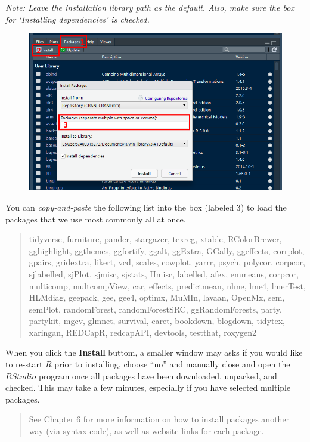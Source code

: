\documentclass[]{book}
\begin{document}
\emph{Note: Leave the installation library path as the default. Also,
make sure the box for `Installing dependencies' is checked.}

\begin{figure}
\centering
\includegraphics{images/Install_Package_Screenshot.png}
\caption{}
\end{figure}

You can \emph{copy-and-paste} the following list into the box (labeled
3) to load the packages that we use most commonly all at once.

\begin{quote}
tidyverse, furniture, pander, stargazer, texreg, xtable, RColorBrewer,
gghighlight, ggthemes, ggfortify, ggalt, ggExtra, GGally, ggeffects,
corrplot, gpairs, gridextra, likert, vcd, scales, cowplot, yarrr, psych,
polycor, corpcor, sjlabelled, sjPlot, sjmisc, sjstats, Hmisc, labelled,
afex, emmeans, corpcor, multicomp, multcompView, car, effects,
predictmean, nlme, lme4, lmerTest, HLMdiag, geepack, gee, gee4, optimx,
MuMIn, lavaan, OpenMx, sem, semPlot, randomForest, randomForestSRC,
ggRandomForests, party, partykit, mgcv, glmnet, survival, caret,
bookdown, blogdown, tidytex, xaringan, REDCapR, redcapAPI, devtools,
testthat, roxygen2
\end{quote}

When you click the \textbf{Install} buttom, a smaller window may asks if
you would like to re-start \(R\) prior to installing, choose ``no'' and
manually close and open the \(R Studio\) program once all packages have
been downloaded, unpacked, and checked. This may take a few minutes,
especially if you have selected multiple packages.

\begin{quote}
See Chapter 6 for more information on how to install packages another
way (via syntax code), as well as website links for each package.
\end{quote}
\end{document}
